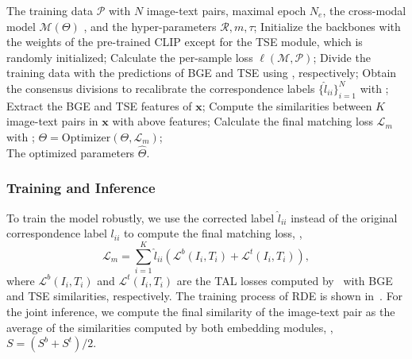 \documentclass[10pt,twocolumn,letterpaper]{article}
\begin{document}
    
 \begin{algorithm}[!h]
	\renewcommand{\algorithmicrequire}{\textbf{Input:}}
	\renewcommand{\algorithmicensure}{\textbf{Output:}}
	\caption{The training process of our RDE}
	\label{Alg1}
	\begin{algorithmic}[1]
	\REQUIRE The training data $\mathcal{P}$ with $N$ image-text pairs, maximal epoch $N_e$, the cross-modal model $\mathcal{M}(\Theta)$ , and the hyper-parameters $\mathcal{R},m,\tau$;
     \STATE Initialize the backbones with the weights of the pre-trained CLIP except for the TSE module, which is randomly initialized;
                \STATE Calculate the per-sample loss $\ell(\mathcal{M},\mathcal{P})$;
                \STATE Divide the training data with the predictions of BGE and TSE using , respectively;
                \STATE Obtain the consensus divisions to recalibrate the correspondence labels $\{\hat{l}_{ii}\}^N_{i=1}$ with ;
                    \STATE Extract the BGE and TSE features of $\mathbf{x}$;  
                    \STATE Compute the similarities between $K$ image-text pairs in $\mathbf{x}$ with above features;
                    \STATE Calculate the final matching loss $\mathcal{L}_{m}$ with ;                    \STATE${\Theta}=\text{Optimizer}\left(\Theta,\mathcal{L}_{m}\right)$;\\
                \ENDFOR
		\ENDFOR
		\ENSURE The optimized parameters $\hat{\Theta}$.
	\end{algorithmic}  
\label{Impl}
\end{algorithm}
\subsubsection{Training and Inference}
To train the model robustly, we use the corrected label $\hat{l}_{ii}$ instead of the original correspondence label $l_{ii}$ to compute the final matching loss, \ie,
\begin{equation}\label{loss}
    \mathcal{L}_{m} = \sum^K_{i=1} \hat{l}_{ii}(\mathcal{L}^b(I_i,T_i)+\mathcal{L}^t(I_i,T_i)),
\end{equation}
where $\mathcal{L}^b(I_i,T_i)$ and $\mathcal{L}^t(I_i,T_i)$ are the TAL losses computed by~ with BGE and TSE similarities, respectively. The training process of RDE is shown in~. For the joint inference, we compute the final similarity of the image-text pair as the average of the similarities computed by both embedding modules, \ie, $S=(S^b+S^t)/2$.
\end{document}
